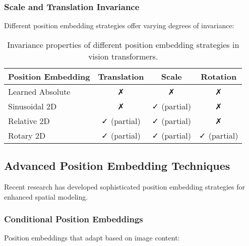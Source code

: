 \subsubsection{Scale and Translation Invariance}

Different position embedding strategies offer varying degrees of invariance:

\begin{table}[htbp]
\centering
\begin{tabular}{lccc}
\toprule
\textbf{Position Embedding} & \textbf{Translation} & \textbf{Scale} & \textbf{Rotation} \\
\midrule
Learned Absolute & ✗ & ✗ & ✗ \\
Sinusoidal 2D & ✗ & ✓ (partial) & ✗ \\
Relative 2D & ✓ (partial) & ✓ (partial) & ✗ \\
Rotary 2D & ✓ (partial) & ✓ (partial) & ✓ (partial) \\
\bottomrule
\end{tabular}
\caption{Invariance properties of different position embedding strategies in vision transformers.}
\end{table}

\subsection{Advanced Position Embedding Techniques}

Recent research has developed sophisticated position embedding strategies for enhanced spatial modeling.

\subsubsection{Conditional Position Embeddings}

Position embeddings that adapt based on image content:

